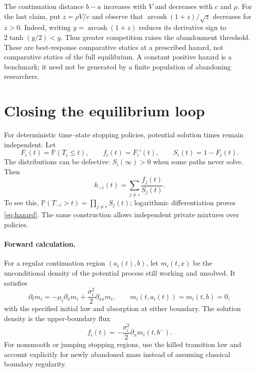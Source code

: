 \documentclass[11pt]{article}
\newcommand{\PP}{\mathbb P}
\DeclareMathOperator{\arcosh}{arcosh}
\begin{document}
The continuation distance $b-a$ increases with $V$ and decreases with $c$
and $\rho$. For the last claim, put $z=\rho V/c$ and observe that
$\arcosh(1+z)/\sqrt z$ decreases for $z>0$. Indeed, writing
$y=\arcosh(1+z)$ reduces its derivative sign to
$2\tanh(y/2)<y$. Thus greater competition raises the abandonment threshold.
These are best-response comparative statics at a prescribed hazard, not
comparative statics of the full equilibrium. A constant positive hazard
is a benchmark; it need not be generated by a finite population of
abandoning researchers.

\section{Closing the equilibrium loop}
For deterministic time--state stopping policies, potential solution times
remain independent. Let
\begin{equation}\label{eq:survival}
F_i(t)=\PP(T_i\le t),\qquad f_i(t)=F_i'(t),\qquad S_i(t)=1-F_i(t).
\end{equation}
The distributions can be defective: $S_i(\infty)>0$ when some paths never
solve. Then
\begin{equation}\label{eq:hazard}
\boxed{h_{-i}(t)=\sum_{j\ne i}\frac{f_j(t)}{S_j(t)}.}
\end{equation}
To see this, $\PP(T_{-i}>t)=\prod_{j\ne i}S_j(t)$; logarithmic
differentiation proves \eqref{eq:hazard}. The same construction allows
independent private mixtures over policies.

\paragraph{Forward calculation.}
For a regular continuation region $(a_i(t),b)$, let $m_i(t,x)$ be the
unconditional density of the potential process still working and unsolved.
It satisfies
\begin{equation}\label{eq:forward}
\partial_t m_i=-\mu_i\partial_xm_i
 +\frac{\sigma_i^2}{2}\partial_{xx}m_i,
\qquad m_i(t,a_i(t))=m_i(t,b)=0,
\end{equation}
with the specified initial law and absorption at either boundary.
The solution density is the upper-boundary flux
\begin{equation}\label{eq:flux}
f_i(t)=-\frac{\sigma_i^2}{2}\partial_xm_i(t,b^-).
\end{equation}
For nonsmooth or jumping stopping regions, use the killed transition law
and account explicitly for newly abandoned mass instead of assuming
classical boundary regularity.
\end{document}
